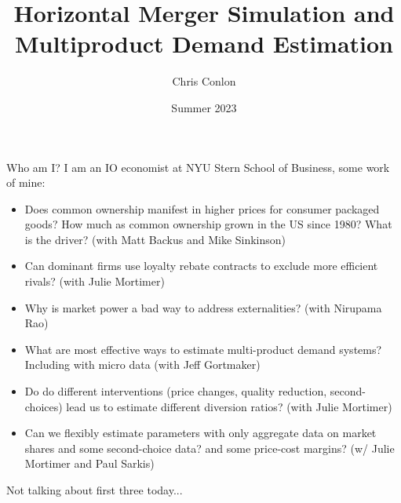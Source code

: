 

\usepackage{lipsum}
\usepackage{amsmath} 
\usepackage{amsthm} 
\usepackage{amssymb} 
\usepackage{mathtools}
\usepackage{dutchcal}


\newcommand{\vect}[1]{\symbf{\symbf{#1}}}
\newcommand{\pd}[2]{\frac{\partial{#1}}{\partial{#2}}}
\newcommand{\expect}[2]{\mathbb{E}_{#1}\left[{#2}\right]}
\newcommand{\expectsmall}[2]{\mathbb{E}_{#1}{#2}}
\newcommand{\expectsuper}[3]{\mathbb{E}_{#1}^{#2}\left[{#3}\right]}
\newcommand{\ind}[1]{\mathbbm{1}\left\{{#1}\right\}}
\newcommand{\prob}[1]{\mathbb{P}\left\{{#1}\right\}}
\newcommand{\derivative}[2]{\frac{d{#2}}{d{#1}}}
\newcommand{\cat}[1]{\citeasnoun{#1}}


\newcommand*{\vertbar}{\rule[-1ex]{0.5pt}{2.5ex}}
\newcommand*{\horzbar}{\rule[.5ex]{2.5ex}{0.5pt}}


\title{Horizontal Merger Simulation and Multiproduct Demand Estimation}
\author{Chris Conlon}

\date{Summer 2023}








\begin{frame}[plain] %
\titlepage
\end{frame}


\begin{frame}{Who am I?}
I am an IO economist at NYU Stern School of Business, some work of mine:
\begin{itemize}
    \item Does \alert{common ownership} manifest in higher prices for consumer packaged goods? How much as common ownership grown in the US since 1980? What is the driver? (with Matt Backus and Mike Sinkinson)
    \item Can dominant firms use \alert{loyalty rebate contracts to exclude} more efficient rivals? (with Julie Mortimer)
    \item Why is market power a bad way to address \alert{externalities}? (with Nirupama Rao)
\item What are most effective ways to estimate multi-product demand systems? Including with micro data (with Jeff Gortmaker)
\item Do do \alert{different interventions} (price changes, quality reduction, second-choices) lead us to estimate different \alert{diversion ratios}? (with Julie Mortimer)
\item Can we flexibly estimate parameters with only aggregate data on market shares and some second-choice data? and some price-cost margins? (w/ Julie Mortimer and Paul Sarkis)
\end{itemize}
Not talking about first three today...
\end{frame}


